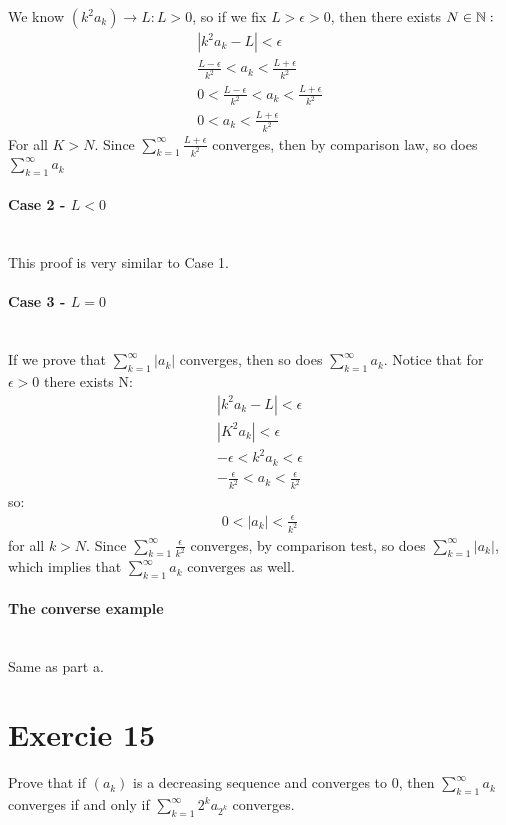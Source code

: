 \documentclass[11pt]{article}
\begin{document}
We know $(k^2a_k)\rightarrow L:L>0$, so if we fix $L>\epsilon>0$, then there exists $N\in\mathbb{N}:$
\begin{align*}
	|k^2a_k-L|<\epsilon\\
	\frac{L-\epsilon}{k^2}<a_k<\frac{L+\epsilon}{k^2}\\
	0<\frac{L-\epsilon}{k^2}<a_k<\frac{L+\epsilon}{k^2}\\
	0<a_k<\frac{L+\epsilon}{k^2}
\end{align*}
For all $K>N$. Since $\sum\limits_{k=1}^{\infty}\frac{L+\epsilon}{k^2}$ converges, then by comparison law, so does $\sum\limits_{k=1}^{\infty}a_k$

\paragraph{Case 2 - $L<0$} ~\\

This proof is very similar to Case 1.

\paragraph{Case 3 - $L=0$} ~\\

If we prove that $\sum\limits_{k=1}^{\infty}|a_k|$ converges, then so does $\sum\limits_{k=1}^{\infty}a_k$.
Notice that for $\epsilon>0$ there exists N:
\begin{align*}
	{|k^2a_k-L|<\epsilon}\\
	{|K^2a_k|<\epsilon}\\
	{-\epsilon<k^2a_k<\epsilon}\\
	{-\frac{\epsilon}{k^2}}<a_k<\frac{\epsilon}{k^2}
\end{align*}
so:
\begin{align*}
	0<|a_k|<\frac{\epsilon}{k^2}
\end{align*}
for all $k>N$. Since $\sum\limits_{k=1}^{\infty}\frac{\epsilon}{k^2}$ converges, by comparison test, so does $\sum\limits_{k=1}^{\infty}|a_k|$, which implies that $\sum\limits_{k=1}^{\infty}a_k$ converges as well.

\paragraph{The converse example} ~\\ 

Same as part a.

\section*{Exercie 15}
Prove that if $(a_k)$ is a decreasing sequence and converges to 0, then $\sum\limits_{k=1}^{\infty}a_k$ converges if and only if $\sum\limits_{k=1}^{\infty}2^k a_{2^k}$ converges.
\end{document}
